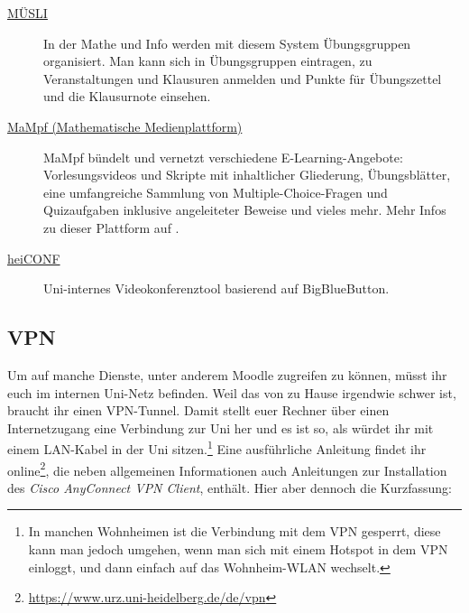 \begin{description}
	\item[\href{https://muesli.mathi.uni-heidelberg.de}{MÜSLI}]
    In der Mathe und Info werden mit diesem System Übungsgruppen organisiert. Man kann sich in Übungsgruppen eintragen, zu Veranstaltungen und Klausuren anmelden und Punkte für Übungszettel und die Klausurnote einsehen.

	\item[\href{https://mampf.mathi.uni-heidelberg.de}{MaMpf (Mathematische Medienplattform)}]
    MaMpf bündelt und vernetzt verschiedene E-Learning-Angebote: Vorlesungsvideos und Skripte mit inhaltlicher Gliederung, Übungsblätter, eine umfangreiche Sammlung von Multiple-Choice-Fragen und Quizaufgaben inklusive angeleiteter Beweise und vieles mehr. Mehr Infos zu dieser Plattform auf .

	\item[\href{https://heiconf.uni-heidelberg.de}{heiCONF}]
    Uni-internes Videokonferenztool basierend auf BigBlueButton. 
\end{description}

\newpage

\subsection{VPN}
Um auf manche Dienste, unter anderem Moodle zugreifen zu können, müsst ihr euch im internen Uni-Netz befinden. Weil das von zu Hause irgendwie schwer ist, braucht ihr einen VPN-Tunnel. Damit stellt euer Rechner über einen Internetzugang eine Verbindung zur Uni her und es ist so, als würdet ihr mit einem LAN-Kabel in der Uni sitzen.\footnote{In manchen Wohnheimen ist die Verbindung mit dem VPN gesperrt, diese kann man jedoch umgehen, wenn man sich mit einem Hotspot in dem VPN einloggt, und dann einfach auf das Wohnheim-WLAN wechselt.} Eine ausführliche Anleitung findet ihr online\footnote{\url{https://www.urz.uni-heidelberg.de/de/vpn}}, die neben allgemeinen Informationen auch Anleitungen zur Installation des \emph{Cisco AnyConnect VPN Client}, enthält. Hier aber dennoch die Kurzfassung:

